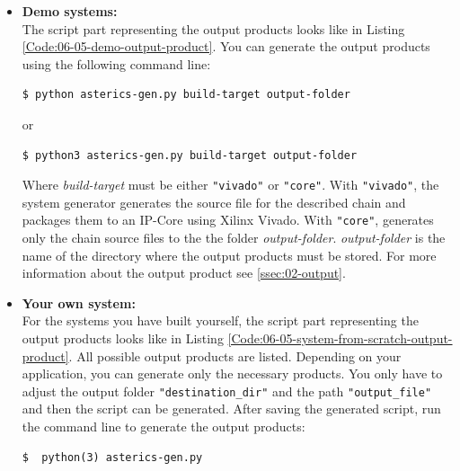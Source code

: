 	\begin{itemize}
		\item \textbf{Demo systems:}\\
			The script part representing the output products looks like in Listing \ref{Code:06-05-demo-output-product}. You can generate the output products using the following command line:
\begin{lstlisting}[style=shell]
$ python asterics-gen.py build-target output-folder
\end{lstlisting}
or 
\begin{lstlisting}[style=shell]
$ python3 asterics-gen.py build-target output-folder
\end{lstlisting}
			Where \textit{build-target} must be either \texttt{"vivado"} or \texttt{"core"}. With \texttt{"vivado"}, the \asterics system generator \automatics generates the source file for the described \asterics chain and packages them to an IP-Core using Xilinx Vivado. With \texttt{"core"}, \automatics generates only the \asterics chain source files to the the folder \textit{output-folder}. \textit{output-folder} is the name of the directory where the output products must be stored. For more information about the output product see \ref{ssec:02-output}.
		\item \textbf{Your own system:} \\
			For the systems you have built yourself, the script part representing the output products looks like in Listing \ref{Code:06-05-system-from-scratch-output-product}. All possible output products are listed. Depending on your application, you can generate only the necessary products. You only have to adjust the output folder \texttt{"destination\_dir"} and the path \texttt{"output\_file"} and then the script can be generated. After saving the generated script, run the command line to generate the output products:
\begin{lstlisting}[style=shell]
 $	python(3) asterics-gen.py
\end{lstlisting}
			
	\end{itemize}


